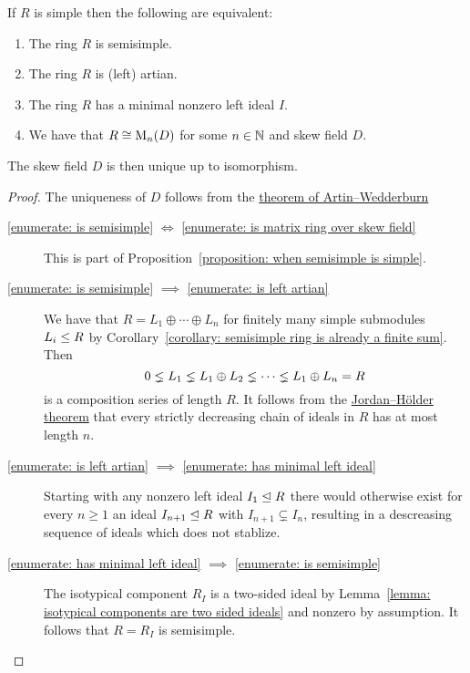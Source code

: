 \begin{theorem}[Wedderburn]
  \label{theorem: wedderburns theorem}
  If $R$ is simple then the following are equivalent:
  \begin{enumerate}
    \item
      \label{enumerate: is semisimple}
      The ring $R$ is semisimple.
    \item 
      \label{enumerate: is left artian}
      The ring $R$ is (left) artian.
    \item
      \label{enumerate: has minimal left ideal}
      The ring $R$ has a minimal nonzero left ideal $I$.
    \item
      \label{enumerate: is matrix ring over skew field}
      We have that $R \cong \operatorname{M}_n(D)$ for some $n \in \mathbb{N}$ and skew field $D$.
  \end{enumerate}
  The skew field $D$ is then unique up to isomorphism.
\end{theorem}


\begin{proof}
  The uniqueness of $D$ follows from the \hyperref[theorem: artin wedderburn theorem]{theorem of Artin--Wedderburn}
  \begin{description}
    \item[\ref*{enumerate: is semisimple} $\iff$ \ref*{enumerate: is matrix ring over skew field}]
      This is part of Proposition~\ref{proposition: when semisimple is simple}.
    \item[\ref*{enumerate: is semisimple} $\implies$ \ref*{enumerate: is left artian}]
      We have that $R = L_1 \oplus \dotsb \oplus L_n$ for finitely many simple submodules $L_i \leq R$ by Corollary~\ref*{corollary: semisimple ring is already a finite sum}.
      Then
      \[
                    0
        \lneq  L_1
        \lneq  L_1 \oplus L_2
        \lneq  \dotsb
        \lneq  L_1 \oplus L_n
        =           R
      \]
      is a composition series of length $R$.
      It follows from the \hyperref[theorem: jordan hoelder theorem]{Jordan--Hölder theorem} that every strictly decreasing chain of ideals in $R$ has at most length $n$.
    \item[\ref*{enumerate: is left artian} $\implies$ \ref*{enumerate: has minimal left ideal}]
      Starting with any nonzero left ideal $I_1 \trianglelefteq R$ there would otherwise exist for every $n \geq 1$ an ideal $I_{n+1} \trianglelefteq R$ with $I_{n+1} \subsetneq I_n$, resulting in a descreasing sequence of ideals which does not stablize.
    \item[\ref*{enumerate: has minimal left ideal} $\implies$ \ref*{enumerate: is semisimple}]
      The isotypical component $R_I$ is a two-sided ideal by Lemma~\ref{lemma: isotypical components are two sided ideals} and nonzero by assumption.
      It follows that $R = R_I$ is semisimple.
    \qedhere
  \end{description}
\end{proof}


